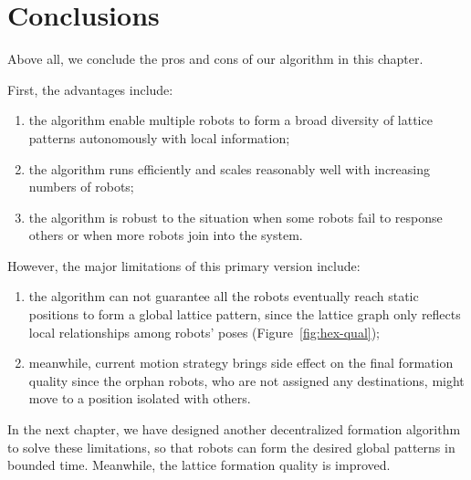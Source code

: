 \section{Conclusions} 
\label{sec:conc-mrf1}
Above all, we conclude the pros and cons of our algorithm in this chapter.

First, the advantages include:
\begin{enumerate}
\item the algorithm enable multiple robots to form a broad diversity of lattice patterns autonomously with local information;
\item the algorithm runs efficiently and scales reasonably well with increasing numbers of robots;
\item the algorithm is robust to the situation when some robots fail to response others or when more robots join into the system.
\end{enumerate}


However, the major limitations of this primary version include:
\begin{enumerate}
\item the algorithm can not guarantee all the robots eventually reach static positions to form a global lattice pattern, since the lattice graph only reflects local relationships among robots' poses (Figure~\ref{fig:hex-qual});
\item meanwhile, current motion strategy brings side effect on the final formation quality since the orphan robots, who are not assigned any destinations, might move to a position isolated with others.
\end{enumerate}

In the next chapter, we have designed another decentralized formation algorithm to solve these limitations, so that robots can form the desired global patterns in bounded time. Meanwhile, the lattice formation quality is improved.